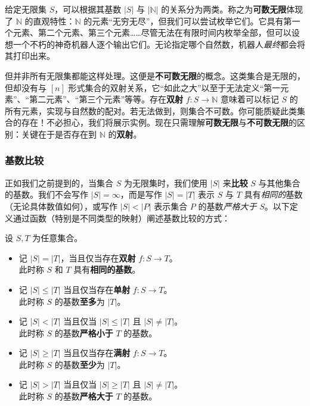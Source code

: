 给定无限集 $S$，可以根据其基数 $|S|$ 与 $|\mathbb{N}|$ 的关系分为两类。称之为\textbf{可数无限}体现了 $\mathbb{N}$ 的直观特性：$\mathbb{N}$ 的元素``无穷无尽''，但我们可以尝试枚举它们。它具有第一个元素、第二个元素、第三个元素……尽管无法在有限时间内枚举全部，但可以设想一个不朽的神奇机器人逐个输出它们。无论指定哪个自然数，机器人\emph{最终}都会将其打印出来。

但并非所有无限集都能这样处理。这便是\textbf{不可数无限}的概念。这类集合是无限的，但却没有与 $[n]$ 形式集合的双射关系，它``如此之大''以至于无法定义``第一元素''、``第二元素''、``第三个元素''等等。存在\textbf{双射} $f : S \to \mathbb{N}$ 意味着可以标记 $S$ 的所有元素，实现与自然数的配对。若无法做到，则集合不可数。你可能质疑此类集合的存在！不必担心，我们将展示实例。现在只需理解\textbf{可数无限}与\textbf{不可数无限}的区别：关键在于是否存在到 $\mathbb{N}$ 的\textbf{双射}。

\subsubsection*{基数比较}

正如我们之前提到的，当集合 $S$ 为无限集时，我们使用 $|S|$ 来\textbf{比较} $S$ 与其他集合的基数。我们不会写作 $|S| = \infty$，而是写作 $|S| = |T|$ 表示 $S$ 与 $T$ 具有\emph{相同的}基数（无论具体数值如何），或写作 $|S| < |P|$ 表示集合 $P$ 的基数\emph{严格大于} $S$。以下定义通过函数（特别是不同类型的映射）阐述基数比较的方式：

\begin{definition}
    设 $S, T$ 为任意集合。

    \begin{itemize}
        \item 记 $|S|=|T|$，当且仅当存在\textbf{双射} $ f : S \to T$。\\
            此时称 $S$ 和 $T$ 具有\textbf{相同的基数}。
        \item 记 $|S|\le|T|$ 当且仅当存在\textbf{单射} $ f : S \to T$。\\
            此时称 $S$ 的基数\textbf{至多}为 $|T|$。
        \item 记 $|S|<|T|$ 当且仅当 $|S|\le|T|$ 且 $|S|\ne|T|$。\\
            此时称 $S$ 的基数\textbf{严格小于} $T$ 的基数。
        \item 记 $|S|\ge|T|$ 当且仅当存在\textbf{满射} $ f : S \to T$。\\
            此时称 $S$ 的基数\textbf{至少}为 $|T|$。
        \item 记 $|S|>|T|$ 当且仅当 $|S|\ge|T|$ 且 $|S|\ne|T|$。\\
            此时称 $S$ 的基数\textbf{严格大于} $T$ 的基数。
    \end{itemize}
\end{definition}

